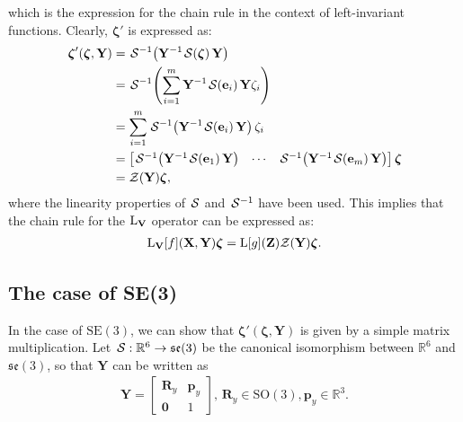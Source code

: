 which is the expression for the chain rule in the context of left-invariant functions. Clearly, $\boldsymbol{\zeta}'$ is expressed as:
\begin{align}
    \boldsymbol{\zeta}'(\boldsymbol{\zeta}, \mathbf{Y}) &= \invSL[\mathbf{Y}^{-1}\SL[\boldsymbol{\zeta}]\mathbf{Y}]\\
    &= \invSL[\sum_{i=1}^m\mathbf{Y}^{-1}\SL[\mathbf{e}_i]\mathbf{Y}\zeta_i]\\
    &= \sum_{i=1}^m\invSL[\mathbf{Y}^{-1}\SL[\mathbf{e}_i]\mathbf{Y}]\zeta_i\\
    &= \begin{bmatrix}
        \invSL[\mathbf{Y}^{-1}\SL[\mathbf{e}_1]\mathbf{Y}] & \cdots & \invSL[\mathbf{Y}^{-1}\SL[\mathbf{e}_m]\mathbf{Y}]
    \end{bmatrix} \boldsymbol{\zeta}\\
    &= \mathcal{Z}(\mathbf{Y})\boldsymbol{\zeta},
\end{align}
where the linearity properties of $\SL$ and $\invSL$ have been used. This implies that the chain rule for the $\operatorname{L}_\mathbf{V}$ operator can be expressed as:
\begin{align}
    \operatorname{L}_\mathbf{V}[f](\mathbf{X}, \mathbf{Y})\boldsymbol{\zeta} = \operatorname{L}[g](\mathbf{Z})\mathcal{Z}(\mathbf{Y})\boldsymbol{\zeta}. \label{app:prop-Lop-chain-rule-LVf-final-form-matrix}
\end{align}

\subsection{The case of SE(3)}\label{app:prop-Lop-chain-rule-SE3}
In the case of $\text{SE}(3)$, we can show that $\boldsymbol{\zeta}'(\boldsymbol{\zeta}, \mathbf{Y})$ is given by a simple matrix multiplication. Let $\SL:\mathbb{R}^6\to\mathfrak{se}(3)$ be the canonical isomorphism between $\mathbb{R}^6$ and $\mathfrak{se}(3)$, so that $\mathbf{Y}$ can be written as
\begin{align}
    \mathbf{Y} = \begin{bmatrix}
        \mathbf{R}_y & \mathbf{p}_y\\
        \mathbf{0} & 1
    \end{bmatrix},\,\mathbf{R}_y\in\text{SO}(3), \mathbf{p}_y\in\mathbb{R}^3.
\end{align}

